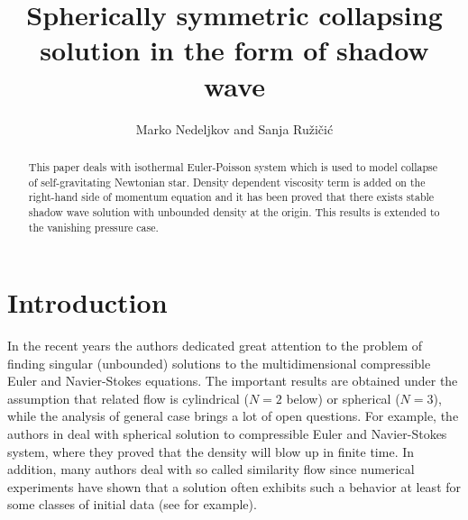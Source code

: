 \documentclass[reqno]{article}%
\theoremstyle{plain}
\theoremstyle{definition}
\theoremstyle{remark}
\numberwithin{equation}{section}
\begin{document}








\title{Spherically symmetric collapsing solution in the form of shadow wave}
\author{Marko Nedeljkov and Sanja Ru\v{z}i\v{c}i\'{c}}

\date{}
\maketitle

\begin{abstract}
This paper deals with isothermal Euler-Poisson system which is used to model collapse of self-gravitating Newtonian star. Density dependent viscosity term is added on the right-hand side of momentum equation and it has been proved that there exists stable shadow wave solution with unbounded density at the origin. This results is extended to the vanishing pressure case.
\end{abstract}

\section{Introduction}

In the recent years the authors dedicated great attention to the problem of finding singular (unbounded) solutions to the multidimensional compressible Euler and Navier-Stokes equations. The important results are obtained under the assumption that  related flow is cylindrical ($N=2$ below) or spherical ($N=3$), while the analysis of general case brings a lot of open questions. For example, the authors in \cite{imp1, imp2} deal with spherical solution to compressible Euler and Navier-Stokes system, where they proved  that the density will blow up in  finite time. In addition, many authors deal with so called similarity flow since  numerical experiments have shown that  a solution often exhibits such a behavior at least for some classes of initial data (see \cite{Jen} for example).
\end{document}
